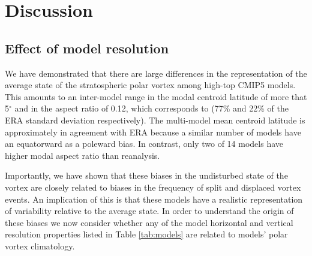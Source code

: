 \section{Discussion}
\subsection{Effect of model resolution}



We have demonstrated that there are large differences in the representation of
the average state of the stratospheric polar vortex among high-top CMIP5
models. This amounts to an inter-model range in the modal centroid latitude of
more that 5$^{\circ}$ and in the aspect ratio of 0.12, which corresponds to
(77\% and 22\% of the ERA standard deviation respectively). The multi-model mean
centroid latitude is approximately in agreement with ERA because a similar
number of models have an equatorward as a poleward bias. In contrast, only two
of 14 models have higher modal aspect ratio than reanalysis.

Importantly, we have shown that these biases in the undisturbed state of the
vortex are closely related to biases in the frequency of split and displaced
vortex events. An implication of this is that these models have a realistic
representation of variability relative to the average state. In order to
understand the origin of these biases we now consider whether any of the model
horizontal and vertical resolution properties listed in Table \ref{tab:models}
are related to models' polar vortex climatology. %


